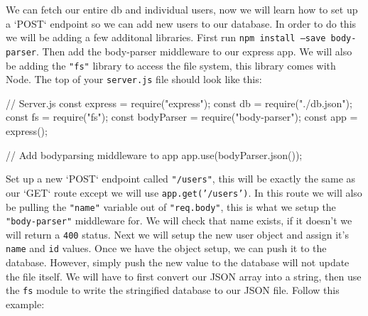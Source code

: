 \documentclass{42-en}
\begin{document}
    We can fetch our entire db and individual users, now we will learn how to set up a `POST` endpoint so we can add new users to our database. In order to do this we will be adding a few additonal libraries. First run \texttt{npm install --save body-parser}. Then add the body-parser middleware to our express app. We will also be adding the \texttt{"fs"} library to access the file system, this library comes with Node. The top of your \texttt{server.js} file should look like this:

\begin{42jscode}
    // Server.js
    const express = require("express");
    const db = require("./db.json");
    const fs = require("fs");
    const bodyParser = require("body-parser");
    const app = express();

    // Add bodyparsing middleware to app
    app.use(bodyParser.json());
\end{42jscode}
\newpage
    Set up a new `POST` endpoint called \texttt{"/users"}, this will be exactly the same as our `GET` route except we will use \texttt{app.get('/users')}. In this route we will also be pulling the \texttt{"name"} variable out of \texttt{"req.body"}, this is what we setup the \texttt{"body-parser"} middleware for. We will check that name exists, if it doesn't we will return a \texttt{400} status. Next we will setup the new user object and assign it's \texttt{name} and \texttt{id} values. Once we have the object setup, we can push it to the database. However, simply push the new value to the database will not update the file itself. We will have to first convert our JSON array into a string, then use the \texttt{fs} module to write the stringified database to our JSON file. Follow this example:



\newpage
\nextexercice
\end{document}
